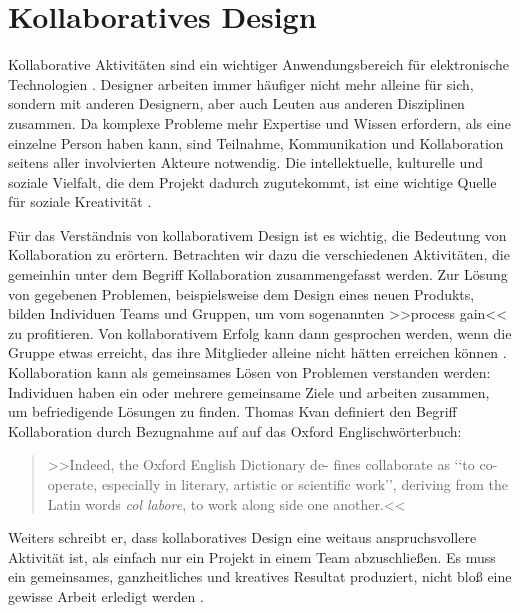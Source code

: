 \chapter{Kollaboratives Design}\label{ch:kollaborativesDesign}

Kollaborative Aktivitäten sind ein wichtiger Anwendungsbereich für elektronische Technologien \citep{Kvan:2000}. Designer arbeiten immer häufiger nicht mehr alleine für sich, sondern mit anderen Designern, aber auch Leuten aus anderen Disziplinen zusammen. Da komplexe Probleme mehr Expertise und Wissen erfordern, als eine einzelne Person haben kann, sind Teilnahme, Kommunikation und Kollaboration seitens aller involvierten Akteure notwendig. Die intellektuelle, kulturelle und soziale Vielfalt, die dem Projekt dadurch zugutekommt, ist eine wichtige Quelle für soziale Kreativität \citep{Fischer:2005}. 

\medskip Für das Verständnis von kollaborativem Design ist es wichtig, die Bedeutung von Kollaboration zu erörtern. Betrachten wir dazu die verschiedenen Aktivitäten, die gemeinhin unter dem Begriff Kollaboration zusammengefasst werden. Zur Lösung von gegebenen Problemen, beispielsweise dem Design eines neuen Produkts, bilden Individuen Teams und Gruppen, um vom sogenannten >>process gain<< \citep{steiner:1972} zu profitieren. Von kollaborativem Erfolg kann dann gesprochen werden, wenn die Gruppe etwas erreicht, das ihre  Mitglieder alleine nicht hätten erreichen können \citep{Kvan:2000}. Kollaboration kann als gemeinsames Lösen von Problemen verstanden werden: Individuen haben ein oder mehrere gemeinsame Ziele und arbeiten zusammen, um befriedigende Lösungen zu finden. Thomas Kvan definiert den Begriff Kollaboration durch Bezugnahme auf auf das Oxford Englischwörterbuch:

\begin{quote} 
	>>Indeed, the Oxford English Dictionary de- fines collaborate as ‘‘to co-operate, especially in literary, artistic or scientific work’’, deriving from the Latin words \emph{col labore}, to work along side one another.<< \citep{Kvan:2000} 
\end{quote} 

Weiters schreibt er, dass kollaboratives Design eine weitaus anspruchsvollere Aktivität ist, als einfach nur ein Projekt in einem Team abzuschließen. Es muss ein gemeinsames, ganzheitliches und kreatives Resultat produziert, nicht bloß eine gewisse Arbeit erledigt werden \citep{Kvan:2000}.

